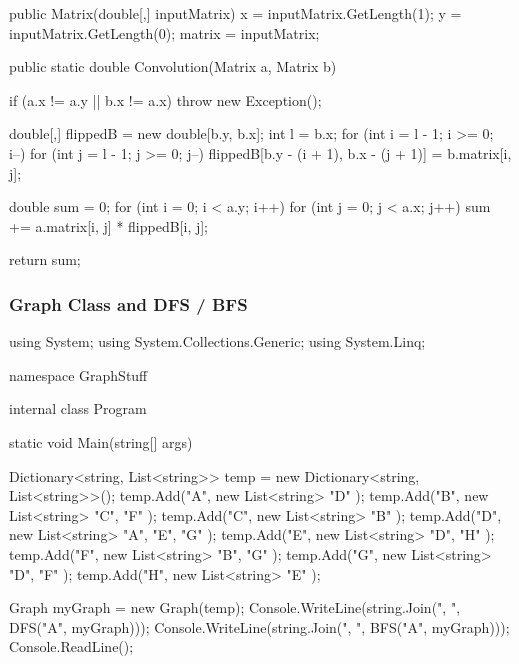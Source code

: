 \begin{flushleft}
\begin{cscode}
{{        public Matrix(double[,] inputMatrix)
        {
            x = inputMatrix.GetLength(1);
            y = inputMatrix.GetLength(0);
            matrix = inputMatrix;
        }

        public static double Convolution(Matrix a, Matrix b)
        {
            if (a.x != a.y || b.x != a.x) throw new Exception();

            double[,] flippedB = new double[b.y, b.x];
            int l = b.x;
            for (int i = l - 1; i >= 0; i--)
            {
                for (int j = l - 1; j >= 0; j--)
                {
                    flippedB[b.y - (i + 1), b.x - (j + 1)] = b.matrix[i, j];
                }
            }


            double sum = 0;
            for (int i = 0; i < a.y; i++)
            {
                for (int j = 0; j < a.x; j++)
                {
                    sum += a.matrix[i, j] * flippedB[i, j];
                }
            }

            return sum;
        }
    }
}
    \end{cscode}
\pagebreak
    \subsubsection{Graph Class and DFS / BFS}
    \begin{cscode}
using System;
using System.Collections.Generic;
using System.Linq;

namespace GraphStuff
{
    internal class Program
    {
        static void Main(string[] args)
        {
            Dictionary<string, List<string>> temp = new Dictionary<string, List<string>>();
            temp.Add("A", new List<string>
            {
                "D"
            });
            temp.Add("B", new List<string>
            {
                "C", "F"
            });
            temp.Add("C", new List<string>
            {
                "B"
            });
            temp.Add("D", new List<string>
            {
                "A", "E", "G"
            });
            temp.Add("E", new List<string>
            {
                "D", "H"
            });
            temp.Add("F", new List<string>
            {
                "B", "G"
            });
            temp.Add("G", new List<string>
            {
                "D", "F"
            });
            temp.Add("H", new List<string>
            {
                "E"
            });

            Graph myGraph = new Graph(temp);
            Console.WriteLine(string.Join(", ", DFS("A", myGraph)));
            Console.WriteLine(string.Join(", ", BFS("A", myGraph)));
            Console.ReadLine();
        }

}}
\end{cscode}
\end{flushleft}
